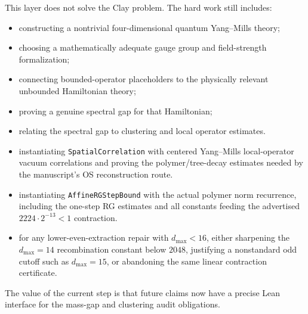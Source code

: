 \documentclass[11pt]{article}
\newcommand{\lean}[1]{\texttt{#1}}
\begin{document}
This layer does not solve the Clay problem.  The hard work still includes:
\begin{itemize}[leftmargin=1.5em]
  \item constructing a nontrivial four-dimensional quantum Yang--Mills theory;
  \item choosing a mathematically adequate gauge group and field-strength
    formalization;
  \item connecting bounded-operator placeholders to the physically relevant
    unbounded Hamiltonian theory;
  \item proving a genuine spectral gap for that Hamiltonian;
  \item relating the spectral gap to clustering and local operator estimates.
  \item instantiating \lean{SpatialCorrelation} with centered Yang--Mills
    local-operator vacuum correlations and proving the polymer/tree-decay
    estimates needed by the manuscript's OS reconstruction route.
  \item instantiating \lean{AffineRGStepBound} with the actual polymer norm
    recurrence, including the one-step RG estimates and all constants feeding
    the advertised \(2224\cdot2^{-13}<1\) contraction.
  \item for any lower-even-extraction repair with \(d_{\max}<16\), either
    sharpening the \(d_{\max}=14\) recombination constant below \(2048\),
    justifying a nonstandard odd cutoff such as \(d_{\max}=15\), or abandoning
    the same linear contraction certificate.
\end{itemize}

The value of the current step is that future claims now have a precise Lean
interface for the mass-gap and clustering audit obligations.
\end{document}
